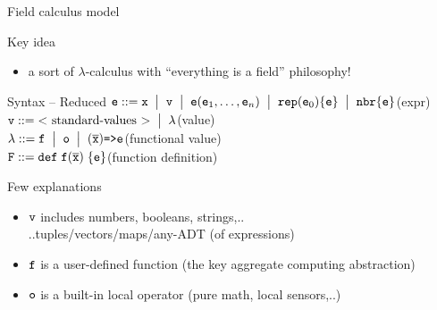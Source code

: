 \documentclass[presentation, 9pt]{beamer}\mode<presentation>{\usetheme{AMSBolognaFC}}
\begin{document}
\begin{frame}{Field calculus model}
\begin{exampleblock}{Key idea}
	\begin{itemize}
  \item a sort of $\lambda$-calculus with ``everything is a field'' philosophy!
	\end{itemize}
\end{exampleblock}
\begin{alertblock}{Syntax -- Reduced}
	$\texttt{e} \;{\bf ::=}\; \texttt{x} 
	\; \;\bigr\rvert\; \; \texttt{v} 
	\; \;\bigr\rvert\; \; {\texttt{e}} (\texttt{e}_1,\ldots,\texttt{e}_n)
	\;\;\bigr\rvert\; \; \texttt{rep}(\texttt{e}_0)\{\texttt{e}\}
	\; \;\bigr\rvert\; \; \texttt{nbr}\{\texttt{e}\}$\hfill(expr)\\
 $\texttt{v} \;{\bf ::=} \; \textrm{$<$ standard-values $>$} \; \;\bigr\rvert\; \; \lambda $\hfill(value)\\
 $\lambda \;{\bf ::=} \; \texttt{f} \; \;\bigr\rvert\; \; \texttt{o} \; \;\bigr\rvert\; \; (\overline{\texttt{x}})\texttt{=>}\texttt{e}$\hfill(functional value)\\
 $\texttt{F} \;{\bf ::=} \; \texttt{def} \; \texttt{f} (\overline{\texttt{x}}) \; \{\texttt{e}\}$\hfill(function definition)
\end{alertblock}
\begin{exampleblock}{Few explanations}
	\begin{itemize}
	\item $\texttt{v}$ includes numbers, booleans, strings,..\\
	..tuples/vectors/maps/any-ADT (of expressions)
	\item $\texttt{f}$ is a user-defined function (the key aggregate computing abstraction)
	\item $\texttt{o}$ is a built-in local operator (pure math, local sensors,..)
	\end{itemize}
\end{exampleblock}
\end{frame}
\end{document}
